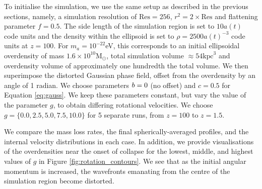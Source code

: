 \documentclass[a4paper,11pt]{article}
\begin{document}
To initialise the simulation, we use the same setup as described in the previous sections, namely, a simulation resolution of $\mathrm{Res} = 256$, $r^2 =  2 \times \mathrm{Res}$ and flattening parameter $f=0.5$. The side length of the simulation region is set to $10a(t)$ code units and the density within the ellipsoid is set to $\rho = 2500a(t)^{-3}$ code units at $z=100$. For $m_a = 10^{-22}$eV, this corresponds to an initial ellipsoidal overdensity of mass $1.6 \times 10^{10}$M$_\odot$, total simulation volume $\approx54\mathrm{kpc}^3$ and overdensity volume of approximately one hundredth the total volume. We then superimpose the distorted Gaussian phase field, offset from the overdensity by an angle of 1 radian. We choose parameters $\boldmath{b} = 0$ (no offset) and $c = 0.5$ for Equation \ref{eq:gauss}. We keep these parameters constant, but vary the value of the parameter $g$, to obtain differing rotational velocities. We choose $g = \{0.0, 2.5, 5.0, 7.5, 10.0\}$ for 5 separate runs, from $z=100$ to $z=1.5$. 

We compare the mass loss rates, the final spherically-averaged profiles, and the internal velocity distributions in each case. In addition, we provide visualisations of the overdensities near the onset of collapse for the lowest, middle, and highest values of $g$ in Figure \ref{fig:rotation_contours}. We see that as the initial angular momentum is increased, the wavefronts emanating from the centre of the simulation region become distorted. 
\end{document}
